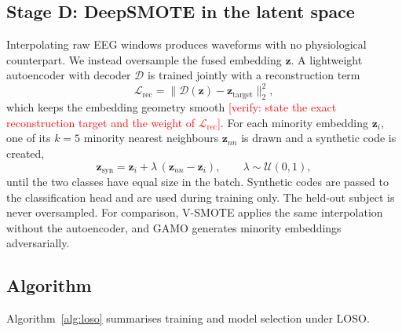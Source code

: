 \documentclass[a4paper,fleqn]{cas-sc}
\newcommand{\vrf}[1]{\textcolor{red}{[verify: #1]}}
\begin{document}
\subsection{Stage D: DeepSMOTE in the latent space}
Interpolating raw EEG windows produces waveforms with no physiological counterpart. We instead oversample the fused embedding $\mathbf{z}$. A lightweight autoencoder with decoder $\mathcal{D}$ is trained jointly with a reconstruction term
\begin{equation}
\mathcal{L}_{\mathrm{rec}}=\|\mathcal{D}(\mathbf{z})-\mathbf{z}_{\mathrm{target}}\|_2^2 ,
\end{equation}
which keeps the embedding geometry smooth \vrf{state the exact reconstruction target and the weight of $\mathcal{L}_{\mathrm{rec}}$}. For each minority embedding $\mathbf{z}_i$, one of its $k=5$ minority nearest neighbours $\mathbf{z}_{nn}$ is drawn and a synthetic code is created,
\begin{equation}
\mathbf{z}_{\mathrm{syn}}=\mathbf{z}_i+\lambda\,(\mathbf{z}_{nn}-\mathbf{z}_i),\qquad \lambda\sim\mathcal{U}(0,1),
\end{equation}
until the two classes have equal size in the batch. Synthetic codes are passed to the classification head and are used during training only. The held-out subject is never oversampled. For comparison, V-SMOTE applies the same interpolation without the autoencoder, and GAMO generates minority embeddings adversarially.

\subsection{Algorithm}
Algorithm~\ref{alg:loso} summarises training and model selection under LOSO.
\end{document}

